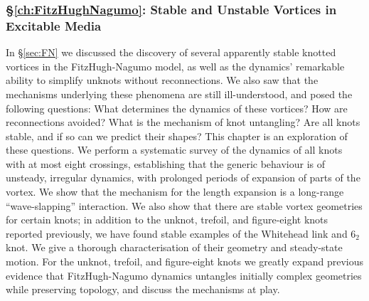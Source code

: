 \subsubsection{\S \ref{ch:FitzHughNagumo}: Stable and Unstable Vortices in Excitable Media}
In \S \ref{sec:FN} we discussed the discovery of several apparently stable knotted vortices in the FitzHugh-Nagumo model, as well as the dynamics' remarkable ability to simplify unknots without reconnections. We also saw that the mechanisms underlying these phenomena are still ill-understood, and posed the following questions: What determines the dynamics of these vortices? How are reconnections avoided? What is the mechanism of knot untangling? Are all knots stable, and if so can we predict their shapes? This chapter is an exploration of these questions. We perform a systematic survey of the dynamics of all knots with at most eight crossings, establishing that the generic behaviour is of unsteady, irregular dynamics, with prolonged periods of expansion of parts of the vortex. We show that the mechanism for the length expansion is a long-range “wave-slapping” interaction. We also show that there are stable vortex geometries for certain knots; in addition to the unknot, trefoil, and figure-eight knots reported previously, we have found stable examples of the Whitehead link and $6_2$ knot. We give a thorough characterisation of their geometry and steady-state motion. For the unknot, trefoil, and figure-eight knots we greatly expand previous evidence that FitzHugh-Nagumo dynamics untangles initially complex geometries while preserving topology, and discuss the mechanisms at play.






